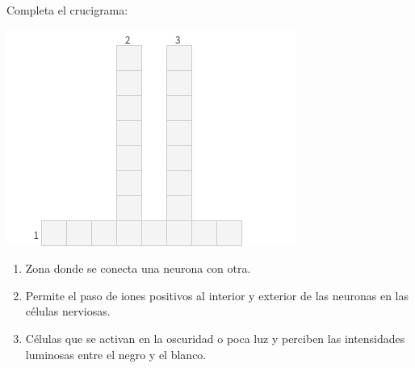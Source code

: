 Completa el crucigrama:

\begin{minipage}{0.45\textwidth}
\includegraphics[width=0.9\linewidth]{../images/SINFI_U3_AC79_IMG1.png}
\end{minipage}\qquad
\begin{minipage}{0.35\textwidth}
    \begin{enumerate}
        \item Zona donde se conecta una neurona con otra.
        \item Permite el paso de iones positivos al interior y exterior de las neuronas en las células nerviosas.
        \item Células que se activan en la oscuridad o poca luz y perciben las intensidades luminosas entre el negro y el blanco.
    \end{enumerate}
\end{minipage}

